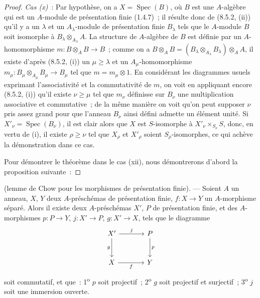 \begin{proof}
\emph{Cas (x)}~: Par hypothèse, on a $X=\operatorname{Spec}(B)$, où $B$ est
une $A$-algèbre qui est un $A$-module de présentation finie (1.4.7)~; il
résulte donc de (8.5.2, (ii)) qu'il y a un $\lambda$ et un $A_\lambda$-module
de présentation finie $B_\lambda$ tels que le $A$-module $B$ soit isomorphe à
$B_\lambda\otimes_{A_\lambda}A$. La structure de $A$-algèbre de $B$ est
définie par un $A$-homomorphisme $m:B\otimes_AB\to B$~; comme on a
$B\otimes_AB=(B_\lambda\otimes_{A_\lambda}B_\lambda)\otimes_AA$, il existe
d'après (8.5.2, (i)) un $\mu\geq\lambda$ et un $A_\mu$-homomorphisme
$m_\mu:B_\mu\otimes_{A_\mu}B_\mu\to B_\mu$ tel que $m=m_\mu\otimes1$. En
considérant les diagrammes usuels exprimant l'associativité et la
commutativité de $m$, on voit en appliquant encore (8.5.2, (i)) qu'il existe
$\nu\geq\mu$ tel que $m_\nu$ définisse sur $B_\nu$ une multiplication
associative et commutative~; de la même manière on voit qu'on peut supposer
$\nu$ pris assez grand pour que l'anneau $B_\nu$ ainsi défini admette un
élément unité. Si $X'_\nu=\operatorname{Spec}(B_\nu)$, il est clair alors que
$X$ est $S$-isomorphe à $X'_\nu\times_{S_\nu}S$, donc, en vertu de (i), il
existe $\rho\geq\nu$ tel que $X_\rho$ et $X'_\rho$ soient
$S_\rho$-isomorphes, ce qui achève la démonstration dans ce cas.

Pour démontrer le théorème dans le cas (xii), nous démontrerons d'abord la
proposition suivante~:
\end{proof}

\begin{proposition}[8.10.5.1]
\label{IV.8.10.5.1-fr}
(lemme de Chow pour les morphismes de présentation finie). --- Soient $A$ un
anneau, $X$, $Y$ deux $A$-préschémas de présentation finie,
$f:X\to Y$
un $A$-morphisme séparé. Alors il existe deux $A$-préschémas $X'$, $P$ de
présentation finie, et des $A$-morphismes $p:P\to Y$, $j:X'\to P$,
$g:X'\to X$, tels que le diagramme
\[
\begin{tikzcd}[column sep=large,row sep=large]
X' \arrow[r,"j"] \arrow[d,"g"'] & P \arrow[d,"p"] \\
X \arrow[r,"f"'] & Y
\end{tikzcd}
\]
soit commutatif, et que~: 1\textsuperscript{o} $p$ soit projectif~;
2\textsuperscript{o} $g$ soit projectif et surjectif~;
3\textsuperscript{o} $j$ soit une immersion ouverte.
\end{proposition}

